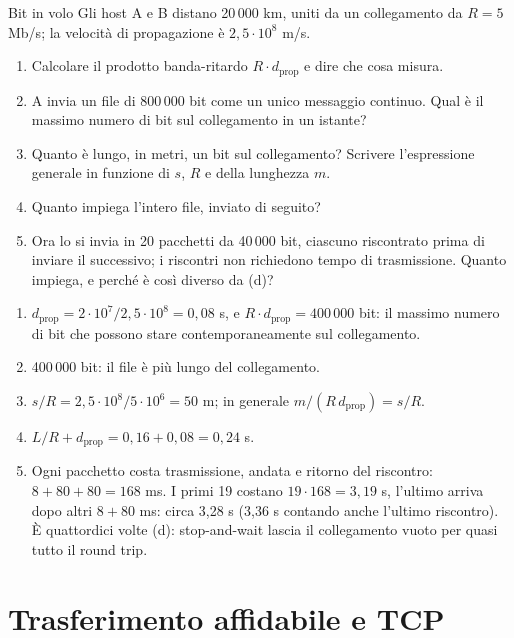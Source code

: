 \begin{esercizio}{Bit in volo}
Gli host A e B distano 20\,000 km, uniti da un collegamento da $R = 5$ Mb/s; la velocità di propagazione è $2{,}5 \cdot 10^8$ m/s.
\begin{enumerate}[label=(\alph*)]
    \item Calcolare il prodotto banda-ritardo $R \cdot d_{\text{prop}}$ e dire che cosa misura.
    \item A invia un file di 800\,000 bit come un unico messaggio continuo. Qual è il massimo numero di bit sul collegamento in un istante?
    \item Quanto è lungo, in metri, un bit sul collegamento? Scrivere l'espressione generale in funzione di $s$, $R$ e della lunghezza $m$.
    \item Quanto impiega l'intero file, inviato di seguito?
    \item Ora lo si invia in 20 pacchetti da 40\,000 bit, ciascuno riscontrato prima di inviare il successivo; i riscontri non richiedono
          tempo di trasmissione. Quanto impiega, e perché è così diverso da (d)?
\end{enumerate}

\svolgimento
\begin{enumerate}[label=(\alph*)]
    \item $d_{\text{prop}} = 2 \cdot 10^7 / 2{,}5 \cdot 10^8 = 0{,}08$ s, e $R \cdot d_{\text{prop}} = 400\,000$ bit: il massimo numero di
          bit che possono stare contemporaneamente sul collegamento.
    \item 400\,000 bit: il file è più lungo del collegamento.
    \item $s/R = 2{,}5 \cdot 10^8 / 5 \cdot 10^6 = 50$ m; in generale $m / (R\, d_{\text{prop}}) = s/R$.
    \item $L/R + d_{\text{prop}} = 0{,}16 + 0{,}08 = 0{,}24$ s.
    \item Ogni pacchetto costa trasmissione, andata e ritorno del riscontro: $8 + 80 + 80 = 168$ ms. I primi 19 costano $19 \cdot 168 =
          3{,}19$ s, l'ultimo arriva dopo altri $8 + 80$ ms: circa 3,28 s (3,36 s contando anche l'ultimo riscontro). È quattordici volte
          (d): stop-and-wait lascia il collegamento vuoto per quasi tutto il round trip.
\end{enumerate}
\end{esercizio}

\section{Trasferimento affidabile e TCP}

